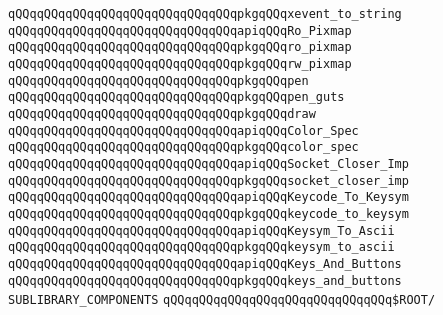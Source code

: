 \verb|qQQqqQQqqQQqqQQqqQQqqQQqqQQqqQQqpkgqQQqxevent_to_string|\newline
\newline
\verb|qQQqqQQqqQQqqQQqqQQqqQQqqQQqqQQqapiqQQqRo_Pixmap|\newline
\verb|qQQqqQQqqQQqqQQqqQQqqQQqqQQqqQQqpkgqQQqro_pixmap|\newline
\verb|qQQqqQQqqQQqqQQqqQQqqQQqqQQqqQQqpkgqQQqrw_pixmap|\newline
\newline
\newline
\verb|qQQqqQQqqQQqqQQqqQQqqQQqqQQqqQQqpkgqQQqpen|\newline
\verb|qQQqqQQqqQQqqQQqqQQqqQQqqQQqqQQqpkgqQQqpen_guts|\newline
\verb|qQQqqQQqqQQqqQQqqQQqqQQqqQQqqQQqpkgqQQqdraw|\newline
\newline
\verb|qQQqqQQqqQQqqQQqqQQqqQQqqQQqqQQqapiqQQqColor_Spec|\newline
\verb|qQQqqQQqqQQqqQQqqQQqqQQqqQQqqQQqpkgqQQqcolor_spec|\newline
\newline
\verb|qQQqqQQqqQQqqQQqqQQqqQQqqQQqqQQqapiqQQqSocket_Closer_Imp|\newline
\verb|qQQqqQQqqQQqqQQqqQQqqQQqqQQqqQQqpkgqQQqsocket_closer_imp|\newline
\newline
\verb|qQQqqQQqqQQqqQQqqQQqqQQqqQQqqQQqapiqQQqKeycode_To_Keysym|\newline
\verb|qQQqqQQqqQQqqQQqqQQqqQQqqQQqqQQqpkgqQQqkeycode_to_keysym|\newline
\newline
\verb|qQQqqQQqqQQqqQQqqQQqqQQqqQQqqQQqapiqQQqKeysym_To_Ascii|\newline
\verb|qQQqqQQqqQQqqQQqqQQqqQQqqQQqqQQqpkgqQQqkeysym_to_ascii|\newline
\newline
\verb|qQQqqQQqqQQqqQQqqQQqqQQqqQQqqQQqapiqQQqKeys_And_Buttons|\newline
\verb|qQQqqQQqqQQqqQQqqQQqqQQqqQQqqQQqpkgqQQqkeys_and_buttons|\newline
\newline
\newline
\verb|SUBLIBRARY_COMPONENTS|\newline
\newline
\verb|qQQqqQQqqQQqqQQqqQQqqQQqqQQqqQQq$ROOT/|\newline
